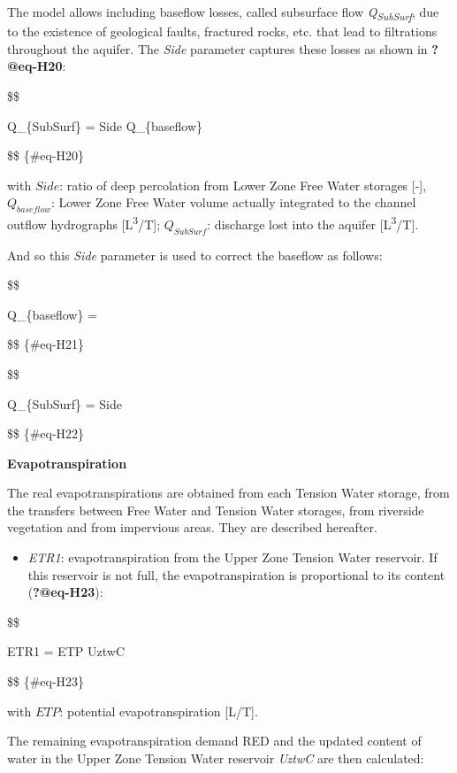 \documentclass[
  letterpaper,
  DIV=11,
  numbers=noendperiod]{scrreprt}
\providecommand{\tightlist}{%
  \setlength{\itemsep}{0pt}\setlength{\parskip}{0pt}}\usepackage{longtable,booktabs,array}
\begin{document}
The model allows including baseflow losses, called subsurface flow
\emph{Q\textsubscript{SubSurf}}, due to the existence of geological
faults, fractured rocks, etc. that lead to filtrations throughout the
aquifer. The \emph{Side} parameter captures these losses as shown in
\textbf{?@eq-H20}:

\$\$

Q\_\{SubSurf\} = Side \cdot Q\_\{baseflow\}

\$\$ \{\#eq-H20\}

with \(Side\): ratio of deep percolation from Lower Zone Free Water
storages {[}-{]}, \(Q_{baseflow}\): Lower Zone Free Water volume
actually integrated to the channel outflow hydrographs
{[}L\textsuperscript{3}/T{]}; \(Q_{SubSurf}\): discharge lost into the
aquifer {[}L\textsuperscript{3}/T{]}.

And so this \emph{Side} parameter is used to correct the baseflow as
follows:

\$\$

Q\_\{baseflow\} = 

\$\$ \{\#eq-H21\}

\$\$

Q\_\{SubSurf\} = Side \cdot {}

\$\$ \{\#eq-H22\}

\textbf{Evapotranspiration}

The real evapotranspirations are obtained from each Tension Water
storage, from the transfers between Free Water and Tension Water
storages, from riverside vegetation and from impervious areas. They are
described hereafter.

\begin{itemize}
\tightlist
\item
  \emph{ETR1}: evapotranspiration from the Upper Zone Tension Water
  reservoir. If this reservoir is not full, the evapotranspiration is
  proportional to its content (\textbf{?@eq-H23}):
\end{itemize}

\$\$

ETR1 = ETP \cdot {} \leq UztwC

\$\$ \{\#eq-H23\}

with \(ETP\): potential evapotranspiration {[}L/T{]}.

The remaining evapotranspiration demand RED and the updated content of
water in the Upper Zone Tension Water reservoir \emph{UztwC} are then
calculated:
\end{document}
